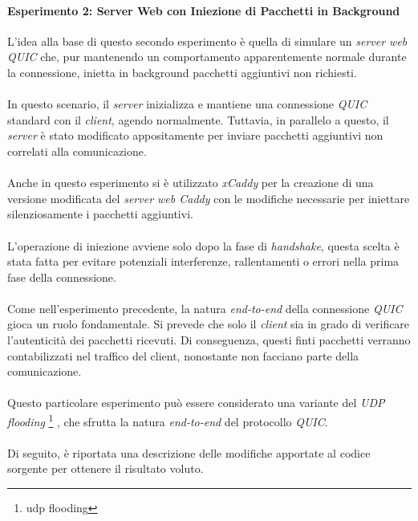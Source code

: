 \paragraph{Esperimento 2: Server Web con Iniezione di Pacchetti in Background}
\noindent L'idea alla base di questo secondo esperimento è quella di simulare un \emph{server web QUIC} che, 
pur mantenendo un comportamento apparentemente normale durante la connessione, inietta in background pacchetti aggiuntivi non richiesti.
\\\\
In questo scenario, il \emph{server} inizializza e mantiene una connessione \emph{QUIC} standard con il \emph{client}, agendo normalmente. Tuttavia, in parallelo a questo, il \emph{server} è stato modificato appositamente per inviare pacchetti aggiuntivi non correlati alla comunicazione.
\\\\
Anche in questo esperimento si è utilizzato \emph{xCaddy} per la creazione di una versione modificata del \emph{server web Caddy} con le modifiche necessarie per iniettare silenziosamente i pacchetti aggiuntivi.
\\\\
L'operazione di iniezione avviene solo dopo la fase di \emph{handshake}, questa scelta è stata fatta per evitare potenziali interferenze, rallentamenti o errori nella prima fase della connessione. 
\\\\
Come nell'esperimento precedente, la natura \emph{end-to-end} della connessione \emph{QUIC} gioca un ruolo fondamentale. Si prevede che solo il \emph{client} sia in grado di verificare l'autenticità dei pacchetti ricevuti. 
Di conseguenza, questi finti pacchetti verranno contabilizzati nel traffico del client, nonostante non facciano parte della comunicazione.
\\\\
Questo particolare esperimento può essere considerato una variante del \emph{UDP flooding} \footnote{\gls{udp flooding}} \cite{site:udp-flood}, che sfrutta la natura \emph{end-to-end} del protocollo \emph{QUIC}.
\\\\
Di seguito, è riportata una descrizione delle modifiche apportate al codice sorgente per ottenere il risultato voluto.
